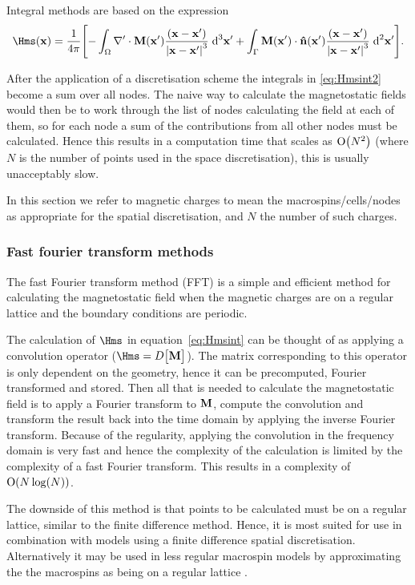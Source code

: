 Integral methods are based on the expression
\begin{equation}
  \Hms(\xv) = \frac{1}{4 \pi} \bigs{ 
    - \int_\magd \nabla' \cdot \Mv(\xv') \frac{(\xv - \xv')}{\abs{\xv -\xv'}^3} \d^3 \xv'
    + \int_\boundd \Mv(\xv') \cdot \nv(\xv') \frac{(\xv - \xv')}{\abs{\xv - \xv'}^3} \d^2 \xv' }.
  \label{eq:Hmsint2}
\end{equation}

After the application of a discretisation scheme the integrals in \cref{eq:Hmsint2} become a sum over all nodes.
The naive way to calculate the magnetostatic fields would then be to work through the list of nodes calculating the field at each of them, so for each node a sum of the contributions from all other nodes must be calculated.
Hence this results in a computation time that scales as $\text{O}{\left( N^2 \right)}$ (where $N$ is the number of points used in the space discretisation), this is usually unacceptably slow.

In this section we refer to magnetic charges to mean the macrospins/cells/nodes as appropriate for the spatial discretisation, and $N$ the number of such charges.


\subsubsection{Fast fourier transform methods}

The fast Fourier transform method (FFT) is a simple and efficient method for calculating the magnetostatic field when the magnetic charges are on a regular lattice and the boundary conditions are periodic.

The calculation of $\Hms$ in equation~\cref{eq:Hmsint} can be thought of as applying a convolution operator (\ie $\Hms = D \big[\Mv\big]$).
The matrix corresponding to this operator is only dependent on the geometry, hence it can be precomputed, Fourier transformed and stored.
Then all that is needed to calculate the magnetostatic field is to apply a Fourier transform to $\mathbf{M}$, compute the convolution and transform the result back into the time domain by applying the inverse Fourier transform.
Because of the regularity, applying the convolution in the frequency domain is very fast and hence the complexity of the calculation is limited by the complexity of a fast Fourier transform.
This results in a complexity of $\text{O}{\left( N \log(N) \right)}$.
\cite{Jones1997}

The downside of this method is that points to be calculated must be on a regular lattice, similar to the finite difference method.
Hence, it is most suited for use in combination with models using a finite difference spatial discretisation.
Alternatively it may be used in less regular macrospin models by approximating the the macrospins as being on a regular lattice \cite{Jones1997}.


